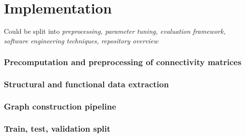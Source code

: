 \documentclass[12pt,a4paper,twoside, openright, hidelinks]{report}
\begin{document}
\chapter{Implementation}

Could be split into \textit{preprocessing, parameter tuning, evaluation framework, software engineering techniques, repository overview}

\subsection{Precomputation and preprocessing of connectivity matrices}

\subsection{Structural and functional data extraction}

\subsection{Graph construction pipeline}

\subsection{Train, test, validation split}
\end{document}
